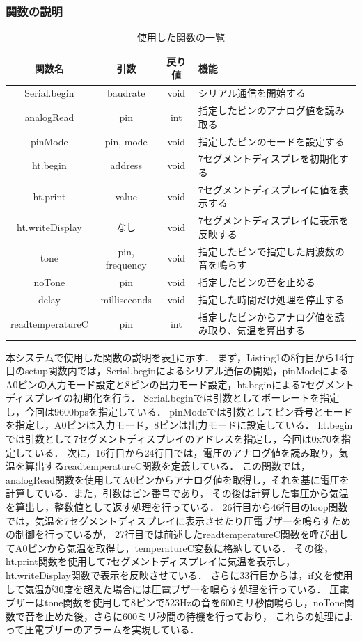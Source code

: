 \documentclass[uplatex,dvipdfmx]{jsarticle}
\begin{document}
\subsubsection{関数の説明}
\begin{table}[H]
  \centering
  \caption{使用した関数の一覧}
  \label{table:functions}
  \begin{tabular}{cccl}
\hline
関数名 & 引数 & 戻り値 & 機能\\\hline \hline
Serial.begin & baudrate & void & シリアル通信を開始する\\ \hline
analogRead & pin & int & 指定したピンのアナログ値を読み取る\\ \hline
pinMode & pin, mode & void & 指定したピンのモードを設定する\\ \hline
ht.begin & address & void & 7セグメントディスプレを初期化する\\ \hline
ht.print & value & void & 7セグメントディスプレイに値を表示する\\ \hline
ht.writeDisplay & なし & void & 7セグメントディスプレイに表示を反映する\\ \hline
tone & pin, frequency & void & 指定したピンで指定した周波数の音を鳴らす\\ \hline
noTone & pin & void & 指定したピンの音を止める\\ \hline
delay & milliseconds & void & 指定した時間だけ処理を停止する\\ \hline
readtemperatureC & pin & int & 指定したピンからアナログ値を読み取り、気温を算出する\\ \hline
\end{tabular}
\end{table}

\indent
本システムで使用した関数の説明を表\ref{table:functions}に示す．
まず，Listing1の8行目から14行目のsetup関数内では，Serial.beginによるシリアル通信の開始，pinModeによるA0ピンの入力モード設定と8ピンの出力モード設定，ht.beginによる7セグメントディスプレイの初期化を行う．
Serial.beginでは引数としてボーレートを指定し，今回は9600bpsを指定している．
pinModeでは引数としてピン番号とモードを指定し，A0ピンは入力モード，8ピンは出力モードに設定している．
ht.beginでは引数として7セグメントディスプレイのアドレスを指定し，今回は0x70を指定している．
次に，16行目から24行目では，電圧のアナログ値を読み取り，気温を算出するreadtemperatureC関数を定義している．
この関数では，analogRead関数を使用してA0ピンからアナログ値を取得し，それを基に電圧を計算している．また，引数はピン番号であり，
その後は計算した電圧から気温を算出し，整数値として返す処理を行っている．
26行目から46行目のloop関数では，気温を7セグメントディスプレイに表示させたり圧電ブザーを鳴らすための制御を行っているが，
27行目では前述したreadtemperatureC関数を呼び出してA0ピンから気温を取得し，temperatureC変数に格納している．
その後，ht.print関数を使用して7セグメントディスプレイに気温を表示し，ht.writeDisplay関数で表示を反映させている．
さらに33行目からは，if文を使用して気温が30度を超えた場合には圧電ブザーを鳴らす処理を行っている．
圧電ブザーはtone関数を使用して8ピンで523Hzの音を600ミリ秒間鳴らし，noTone関数で音を止めた後，さらに600ミリ秒間の待機を行っており，
これらの処理によって圧電ブザーのアラームを実現している．
\end{document}
